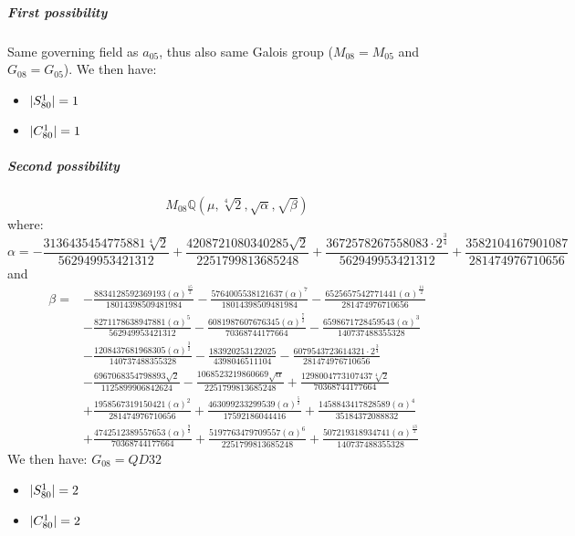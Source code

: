 \subparagraph{First possibility}
Same governing field as $a_{05}$, thus also same Galois group ($M_{08} = M_{05}$ and $G_{08} = G_{05}$). We then have:
\begin{itemize}
	\item $| S_{80}^1 | = 1$
	\item $| C_{80}^1 | = 1$
\end{itemize}
\subparagraph{Second possibility}
$$M_{08}\mathbb{Q}\left(\mu, \sqrt[4]{2}, \sqrt{\alpha}, \sqrt{\beta}\right)$$
where:
$$\alpha = - \frac{3136435454775881 \sqrt[4]{2}}{562949953421312} + \frac{4208721080340285 \sqrt{2}}{2251799813685248} + \frac{3672578267558083 \cdot 2^{\frac{3}{4}}}{562949953421312} + \frac{3582104167901087}{281474976710656}$$
and 
\begin{align*}
	\beta = 
	&- \frac{8834128592369193 \left(\alpha\right)^{\frac{15}{2}}}{18014398509481984} 
	- \frac{5764005538121637 \left(\alpha\right)^{7}}{18014398509481984} 
	- \frac{6525657542771441 \left(\alpha\right)^{\frac{11}{2}}}{281474976710656} 
	\\
	&- \frac{8271178638947881 \left(\alpha\right)^{5}}{562949953421312} 
	- \frac{6081987607676345 \left(\alpha\right)^{\frac{7}{2}}}{70368744177664} 
	- \frac{6598671728459543 \left(\alpha\right)^{3}}{140737488355328} 
	\\
	&- \frac{1208437681968305 \left(\alpha\right)^{\frac{3}{2}}}{140737488355328} - \frac{183920253122025}{4398046511104} 
	- \frac{6079543723614321 \cdot 2^{\frac{3}{4}}}{281474976710656} 
	\\
	&- \frac{6967068354798893 \sqrt{2}}{1125899906842624} 
	- \frac{1068523219860669 \sqrt{\alpha}}{2251799813685248} 
	+ \frac{1298004773107437 \sqrt[4]{2}}{70368744177664} 
	\\
	&+ \frac{1958567319150421 \left(\alpha\right)^{2}}{281474976710656} 
	+ \frac{463099233299539 \left(\alpha\right)^{\frac{5}{2}}}{17592186044416} 
	+ \frac{1458843417828589 \left(\alpha\right)^{4}}{35184372088832} 
	\\
	&+ \frac{4742512389557653 \left(\alpha\right)^{\frac{9}{2}}}{70368744177664} 
	+ \frac{5197763479709557 \left(\alpha\right)^{6}}{2251799813685248} 
	+ \frac{507219318934741 \left(\alpha\right)^{\frac{13}{2}}}{140737488355328}
\end{align*}
We then have:
$G_{08} = QD32$
\begin{itemize}
	\item $| S_{80}^1 | = 2$
	\item $| C_{80}^1 | = 2$
\end{itemize}
